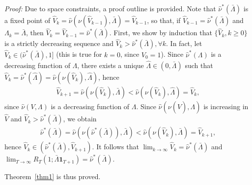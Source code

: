 \documentclass[10pt,twocolumn,twoside]{IEEEtran}
\theoremstyle{plain}
\begin{document}
\noindent\emph{Proof:}
Due to space constraints, a proof outline is provided. 
Note that $\hat\nu^*(\bar \Lambda)$ is a fixed point of 
$\hat V_k{=}\hat \nu(\nu(\hat V_{k-1}),\bar\Lambda){=}\hat V_{k-1}$, so that, if $\hat V_{k-1}{=}\hat\nu^*(\bar \Lambda)$ and $\Lambda_k{=}\bar\Lambda$, then $\hat V_k{=}\hat V_{k-1}{=}\hat\nu^*(\bar \Lambda)$.
First, we show by induction that $\{\hat V_k,k{\geq}0\}$ is a strictly decreasing sequence and $\hat V_k{>}\hat\nu^*(\bar \Lambda),\forall k$. 
In fact, let $\hat V_k{\in}(\hat\nu^*(\bar \Lambda),1]$ (this is true for $k{=}0$, since $V_0{=}1$). 
Since $\hat\nu^*(\Lambda)$ is a decreasing function of $\Lambda$,
there exists a unique $\hat\Lambda{\in}(0,\bar \Lambda)$ such that  $\hat V_k{=}\hat\nu^*(\hat\Lambda){=}\hat \nu(\nu(\hat V_{k}),\hat\Lambda)$,
hence
\begin{align}
\hat V_{k+1}=\hat\nu(\nu(\hat V_{k}),\bar\Lambda)
<\hat\nu(\nu(\hat V_{k}),\hat\Lambda)=\hat V_{k},
\end{align}
since $\hat\nu(V,\Lambda)$ is a decreasing function of $\Lambda$.
Since $\hat\nu(\nu(\hat V),\Lambda)$ is increasing in $\hat V$ and $\hat V_k>\hat\nu^*(\bar\Lambda)$, we obtain
\begin{align}
\hat\nu^*(\bar\Lambda)=\hat\nu(\nu(\hat\nu^*(\bar\Lambda)),\bar\Lambda)<
\hat\nu(\nu(\hat V_k),\bar\Lambda)=\hat V_{k+1},
\end{align}
hence $\hat V_k{\in}(\hat\nu^*(\bar \Lambda),\hat V_{k+1})$.
It follows that
 $\lim_{k\to\infty}\hat V_k{=}\hat\nu^*(\bar \Lambda)$ and $\lim_{T\to\infty}R_T(1;\bar \Lambda\mathbf 1_{T+1}){=}\hat\nu^*(\bar \Lambda)$.
\hfill\QED

\noindent Theorem~\ref{thm1} is thus proved.
\hfill\QED

\vspace{-3mm}
\end{document}
